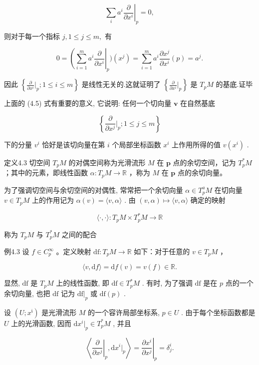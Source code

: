$$
\sum_ {i} a ^ {i} \left. \frac {\partial}{\partial x ^ {i}} \right| _ {p} = 0,
$$

则对于每一个指标  $j, 1 \leqslant j \leqslant m,$  有

$$
0 = \left(\sum_ {i = 1} ^ {m} a ^ {i} \frac {\partial}{\partial x ^ {i}} \right| _ {p}) (x ^ {j}) = \sum_ {i = 1} ^ {m} a ^ {i} \frac {\partial x ^ {j}}{\partial x ^ {i}} (p) = a ^ {j}.
$$

因此  $\left\{\frac{\partial}{\partial x^i}\bigg|_p;1\leqslant i\leqslant m\right\}$  是线性无关的.这就证明了  $\left\{\frac{\partial}{\partial x^i}\bigg|_p\right\}$  是 $T_{p}M$  的基底.证毕

上面的 (4.5) 式有重要的意义, 它说明: 任何一个切向量  $\pmb{v}$  在自然基底

$$
\left\{\frac {\partial}{\partial x ^ {j}} \Big | _ {p}; 1 \leqslant j \leqslant m \right\}
$$

下的分量  $v^i$  恰好是该切向量在第  $i$  个局部坐标函数  $x^i$  上作用所得的值  $v(x^i)$ .

定义4.3 切空间  $T_{p}M$  的对偶空间称为光滑流形  $M$  在  $\pmb{p}$  点的余切空间，记为  $T_{p}^{*}M$ ；其中的元素，即线性函数  $\alpha : T_{p}M \to \mathbb{R}$ ，称为  $M$  在  $\pmb{p}$  点的余切向量。

为了强调切空间与余切空间的对偶性, 常常把一个余切向量  $\alpha \in T_{p}^{a}M$  在切向量  $v \in T_{p}M$  上的作用记为  $\alpha(v) = \langle v, \alpha \rangle$ . 由  $(v, \alpha) \mapsto \langle v, \alpha \rangle$  确定的映射

$$
\langle \cdot , \cdot \rangle : T _ {p} M \times T _ {p} ^ {*} M \rightarrow \mathbb {R}
$$

称为  $T_{p}M$  与  $T_{p}^{*}M$  之间的配合

例4.3 设  $f \in C_p^\infty$ 。定义映射  $\mathrm{df}: T_pM \to \mathbb{R}$  如下：对于任意的  $v \in T_pM$ ，

$$
\langle v, \mathrm {d} f \rangle = \mathrm {d} f (v) = v (f) \in \mathbb {R}.
$$

显然,  $\mathrm{df}$  是  $T_{p}M$  上的线性函数, 即  $\mathrm{df} \in T_{p}^{*}M$ . 有时, 为了强调  $\mathrm{df}$  是在  $p$  点的一个余切向量, 也把  $\mathrm{df}$  记为  $\mathrm{df}|_{p}$  或  $\mathrm{df}(p)$ .

设  $(U; x^{\mathfrak{i}})$  是光滑流形  $M$  的一个容许局部坐标系,  $p \in U$ . 由于每个坐标函数都是  $U$  上的光滑函数, 因而  $\mathrm{d}x^{i}|_{p} \in T_{p}^{*}M$ , 并且

$$
\left\langle \left. \frac {\partial}{\partial x ^ {j}} \right| _ {p}, \mathrm {d} x ^ {i} | _ {p} \right\rangle = \left. \frac {\partial x ^ {i}}{\partial x ^ {j}} \right| _ {p} = \delta_ {j} ^ {i}.
$$

